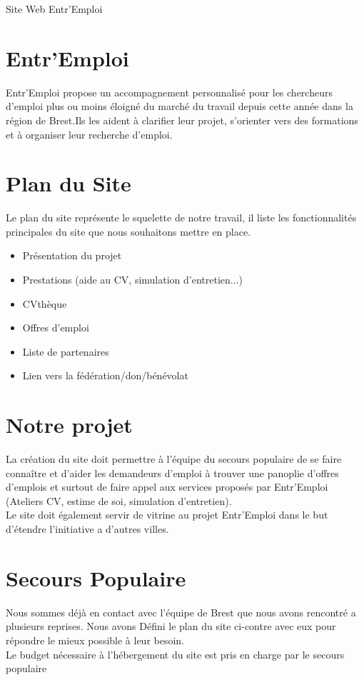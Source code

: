 \documentclass[a4paper, 12pt]{article}
\begin{document}
\begin{center}\Huge Site Web Entr'Emploi\end{center}
\vskip2cm

\begin{multicols}{2}
\section*{Entr'Emploi}
Entr'Emploi propose un accompagnement personnalisé pour les chercheurs d'emploi plus ou moins éloigné du marché du travail depuis cette année dans la région de Brest.Ils les aident à clarifier leur projet, s'orienter vers des formations et à organiser leur recherche d'emploi.
\vskip2cm
\section*{Plan du Site}
Le plan du site représente le squelette de notre travail, il liste les fonctionnalités principales du site que nous souhaitons mettre en place.
\begin{itemize}
    \item Présentation du projet
    \item Prestations (aide au CV, simulation d'entretien...)
    \item CVthèque
    \item Offres d'emploi
    \item Liste de partenaires
    \item Lien vers la fédération/don/bénévolat
\end{itemize}

\section*{Notre projet}
La création du site doit permettre à l'équipe du secours populaire de se faire connaître et d'aider les demandeurs d'emploi à trouver une panoplie d'offres d'emplois et surtout de faire
appel aux services proposés par Entr'Emploi (Ateliers CV, estime de soi, simulation d'entretien).\\
Le site doit également servir de vitrine au projet Entr'Emploi dans le but d'étendre l’initiative a d'autres villes.
\vskip2cm
\section*{Secours Populaire}
Nous sommes déjà en contact avec l'équipe de Brest que nous avons rencontré a plusieurs reprises. Nous avons Défini le plan du site ci-contre avec eux pour répondre le mieux possible à leur besoin.\\
Le budget nécessaire à l’hébergement du site est pris en charge par le secours populaire
\end{multicols}
\end{document}
